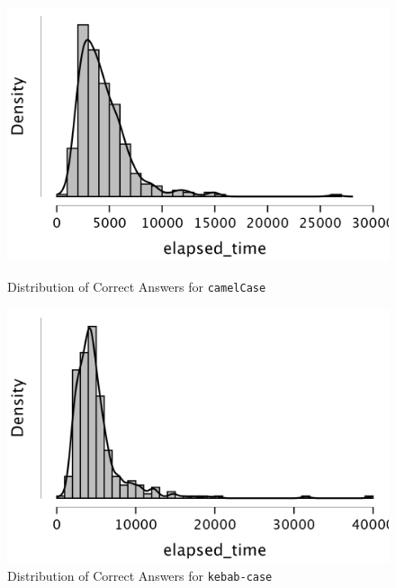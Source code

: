 \documentclass[unicode,11pt,a4paper,oneside,numbers=endperiod,openany]{scrartcl}
\begin{document}
\begin{figure}[h]
    \centering
    \begin{minipage}{0.45\textwidth}
        \centering
        \includegraphics[width=\textwidth]{./figures/correct_camel_distr.png}
        \caption{Distribution of Correct Answers for \texttt{camelCase}}
        \label{fig:correct_camel_distr}
    \end{minipage}
    \hfill
    \begin{minipage}{0.45\textwidth}
        \centering
        \includegraphics[width=\textwidth]{./figures/correct_kebab_distr.png}
        \caption{Distribution of Correct Answers for \texttt{kebab-case}}
        \label{fig:correct_kebab_distr}
    \end{minipage}
\end{figure}
\end{document}
